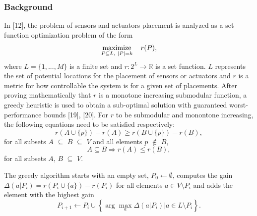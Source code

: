 \documentclass[journal]{IEEEtran}
\begin{document}
\subsubsection{Background}
In [12], the problem of sensors and actuators placement is analyzed as a set function optimization problem of the form
\begin{equation}\mathop{\hbox {maximize}}\limits_{P\subseteq L,\ \vert P\vert=k}\quad r(P),\end{equation}
where $L = \{1,...,M\}$ is a finite set and $r: 2^{L} \rightarrow \mathbb{R}$ is a set function. $L$ represents the set of potential locations for the placement of sensors or actuators and $r$ is a metric for how controllable the system is for a given set of placements.
After proving mathematically that $r$ is a monotone increasing submodular function, a greedy heuristic is used to obtain a sub-optimal solution with guaranteed worst-performance bounds [19], [20]. For $r$ to be submodular and monontone increasing, the following equations need to be satisfied respectively:
\begin{equation}r(A\cup\{p\}) -r(A) \geq r(B\cup\{p\}) -r(B),\end{equation}
for all subsets $A$ $\subseteq$ $B$ $\subseteq$ $V$ and all elements $p$ $\notin$ $B$,
\begin{equation}A \subseteq B \Rightarrow r(A) \leq r(B), \end{equation}
for all subsets $A$, $B$ $\subseteq$ $V$.

The greedy algorithm starts with an empty set, $P_{0} \leftarrow \emptyset$, computes the gain $\Delta(a\vert P_{i})=r(P_{i}\cup\{a\}) - r(P_{i})$ for all elements $a\in V\setminus P_{i}$ and adds the element with the highest gain
\begin{equation}P_{i+1}\leftarrow P_{i}\cup\left\{\arg\max_{a}\Delta(a\vert P_{i})\vert a\in L\setminus P_{i}\right\}.\end{equation}
\end{document}
